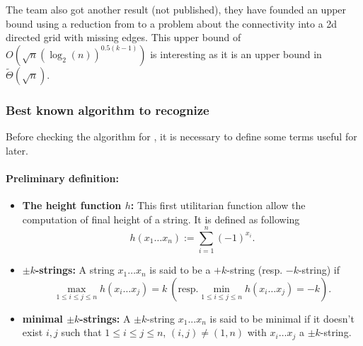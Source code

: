 The team also got another result (not published),
they have founded an upper bound using a reduction from
 to a problem about the connectivity into a 2d
directed grid with missing edges. This upper bound of
$O(\sqrt{n}(\log_2(n))^{0.5(k-1)})$ is interesting as it
is an upper bound in $\tilde{\Theta}(\sqrt{n})$.

\subsubsection{Best known algorithm to recognize }
\label{already_known}

Before checking the algorithm for , it is necessary to define some terms useful
for later.

\paragraph*{\textbf{Preliminary definition:}}

\begin{itemize}
    \item \textbf{The height function $h$:} This first utilitarian function
          allow the computation of final height of a string. It is defined
          as following
          \[h(x_1\ldots x_n) := \sum_{i=1}^n(-1)^{x_i}.\]
    \item \textbf{$\pm k$-strings:} A string $x_1\ldots x_n$ is said to be a $+k$-string
          (resp. $-k$-string) if
          \[\max_{1\leq i\leq j \leq n} h(x_i \ldots x_j) = k\ \left(\textrm{resp.} \min_{1\leq i\leq j \leq n} h(x_i \ldots x_j) = -k\right).\]
    \item \textbf{minimal $\pm k$-strings:} A $\pm k$-string $x_1...x_n$ is said to be minimal
          if it doesn't exist $i, j$ such that $1 \leq i\leq j\leq n$, $(i, j) \neq (1, n)$
          with $x_i\ldots x_j$ a $\pm k$-string.
\end{itemize}

